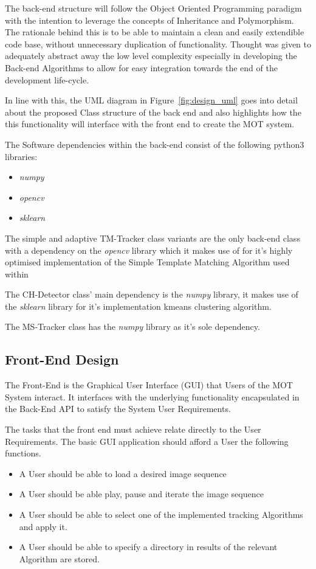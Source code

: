 The back-end structure will follow the Object Oriented Programming paradigm with the intention
to leverage the concepts of Inheritance and Polymorphism. The rationale behind
this is to be able to maintain a clean and easily extendible code base, without
unnecessary duplication of functionality. Thought was given to adequately
abstract away the low level complexity especially in developing the Back-end
Algorithms to allow for easy integration towards the end of the development
life-cycle. 

In line with this, the UML diagram in Figure~\ref{fig:design_uml} goes into
detail about the proposed Class structure of the back end and also highlights how the 
this functionality will interface with the front end to create the MOT system.


The Software dependencies within the back-end consist of the following python3
libraries:
\begin{itemize}
    \item \textit{numpy}
    \item \textit{opencv}
    \item \textit{sklearn}
\end{itemize}

The simple and adaptive TM-Tracker class variants are the only back-end class
with a dependency on the \textit{opencv} library which it makes use of for it's
highly optimised implementation of the Simple Template Matching Algorithm used
within

The CH-Detector class' main dependency is the \textit{numpy} library, it makes
use of the \textit{sklearn} library for it's implementation kmeans clustering
algorithm.

The MS-Tracker class has the \textit{numpy} library as it's sole dependency.

\subsection{Front-End Design}
The Front-End is the Graphical User Interface (GUI) that Users of the MOT
System interact. 
It interfaces with the underlying functionality encapsulated in the Back-End API to
satisfy the System User Requirements. 

The tasks that the front end must achieve relate directly to the User
Requirements. The basic GUI application should afford a User the following functions.
\begin{itemize}
    \item A User should be able to load a desired image sequence
    \item A User should be able play, pause and iterate the image sequence 
    \item A User should be able to select one of the implemented tracking
        Algorithms and apply it.
    \item A User should be able to specify a directory in results of the
        relevant Algorithm are stored.
\end{itemize}

